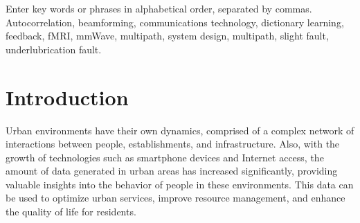 \documentclass{ieeeaccess}
\begin{document}
\begin{keywords}
Enter key words or phrases in alphabetical
order, separated by commas. Autocorrelation, beamforming, communications technology, dictionary learning, feedback, fMRI, mmWave, multipath, system design, multipath, slight fault, underlubrication fault.
\end{keywords}

\titlepgskip=-21pt

\maketitle


\section{Introduction}
\label{sec:introduction}
\PARstart{}{} Urban environments have their own dynamics, comprised of a complex network of interactions between people, establishments, and infrastructure. Also, with the growth of technologies such as smartphone devices and Internet access, the amount of data generated in urban areas has increased significantly, providing valuable insights into the behavior of people in these environments. This data can be used to optimize urban services, improve resource management, and enhance the quality of life for residents.
\end{document}
